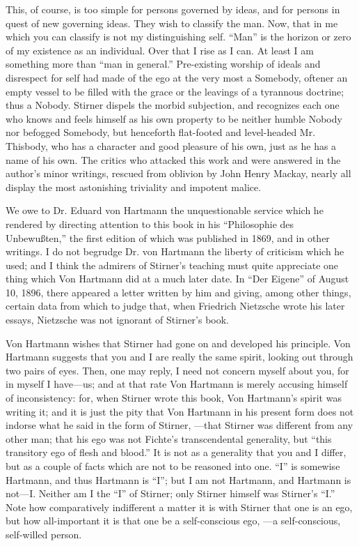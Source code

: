 This, of course, is too simple for persons governed by ideas, and for persons 
in quest of new governing ideas. They wish to classify the man. Now, that in 
me which you can classify is not my distinguishing self. ``Man'' is the 
horizon or zero of my existence as an individual. Over that I rise as I can. 
At least I am something more than ``man in general.'' Pre-existing worship 
of ideals and disrespect for self had made of the ego at the very most a 
Somebody, oftener an empty vessel to be filled with the grace or the leavings 
of a tyrannous doctrine; thus a Nobody. Stirner dispels the morbid subjection, 
and recognizes each one who knows and feels himself as his own property to be 
neither humble Nobody nor befogged Somebody, but henceforth flat-footed and 
level-headed Mr. Thisbody, who has a character and good pleasure of his own, 
just as he has a name of his own. The critics who attacked this work and were 
answered in the author's minor writings, rescued from oblivion by John Henry 
Mackay, nearly all display the most astonishing triviality and impotent 
malice.

We owe to Dr. Eduard von Hartmann the unquestionable service which he rendered 
by directing attention to this book in his ``Philosophie des 
Unbewu\ss{}ten,'' the first edition of which was published in 1869, and in 
other writings. I do not begrudge Dr. von Hartmann the liberty of criticism 
which he used; and I think the admirers of Stirner's teaching must quite 
appreciate one thing which Von Hartmann did at a much later date. In ``Der 
Eigene'' of August 10, 1896, there appeared a letter written by him and 
giving, among other things, certain data from which to judge that, when 
Friedrich Nietzsche wrote his later essays, Nietzsche was not ignorant of 
Stirner's book.

Von Hartmann wishes that Stirner had gone on and developed his principle. Von 
Hartmann suggests that you and I are really the same spirit, looking out 
through two pairs of eyes. Then, one may reply, I need not concern myself 
about you, for in myself I have---us; and at that rate Von Hartmann is merely 
accusing himself of inconsistency: for, when Stirner wrote this book, Von 
Hartmann's spirit was writing it; and it is just the pity that Von Hartmann in 
his present form does not indorse what he said in the form of Stirner, ---that 
Stirner was different from any other man; that his ego was not Fichte's 
transcendental generality, but ``this transitory ego of flesh and blood.'' 
It is not as a generality that you and I differ, but as a couple of facts 
which are not to be reasoned into one. ``I'' is somewise Hartmann, and thus 
Hartmann is ``I''; but I am not Hartmann, and Hartmann is not---I. Neither 
am I the ``I'' of Stirner; only Stirner himself was Stirner's ``I.'' Note 
how comparatively indifferent a matter it is with Stirner that one is an ego, 
but how all-important it is that one be a self-conscious ego, ---a 
self-conscious, self-willed person.

